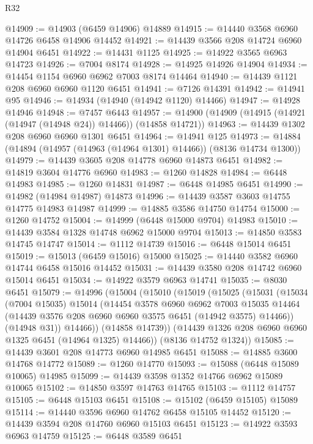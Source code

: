 \begin{lexlean}{R32}
\begin{coremodule}
@14909 := @14903 (@6459 @14906) @14889
@14915 := @14440 @3568 @6960 @14726 @6458 @14906 @14452
@14921 := @14439 @3566 @208 @14724 @6960 @14904 @6451
@14922 := @14431 @1125
@14925 := @14922 @3565 @6963 @14723
@14926 := @7004 @8174
@14928 := @14925 @14926 @14904
@14934 := @14454 @1154 @6960 @6962 @7003 @8174 @14464
@14940 := @14439 @1121 @208 @6960 @6960 @1120 @6451
@14941 := @7126 @14391
@14942 := @14941 @95
@14946 := @14934 (@14940 (@14942 @1120) @14466)
@14947 := @14928 @14946
@14948 := @7457 @6443
@14957 := @14900 (@14909 (@14915 (@14921 (@14947 (@14948 @24)) @14466)) (@14858 @14721))
@14963 := @14439 @1302 @208 @6960 @6960 @1301 @6451
@14964 := @14941 @125
@14973 := @14884 (@14894 (@14957 (@14963 (@14964 @1301) @14466)) (@8136 @14734 @1300))
@14979 := @14439 @3605 @208 @14778 @6960 @14873 @6451
@14982 := @14819 @3604 @14776 @6960
@14983 := @1260 @14828
@14984 := @6448 @14983
@14985 := @1260 @14831
@14987 := @6448 @14985 @6451
@14990 := @14982 (@14984 @14987) @14873
@14996 := @14439 @3587 @3603 @14755 @14775 @14983 @14987
@14999 := @14885 @3586 @14750 @14754
@15000 := @1260 @14752
@15004 := @14999 (@6448 @15000 @9704) @14983
@15010 := @14439 @3584 @1328 @14748 @6962 @15000 @9704
@15013 := @14850 @3583 @14745 @14747
@15014 := @1112 @14739
@15016 := @6448 @15014 @6451
@15019 := @15013 (@6459 @15016) @15000
@15025 := @14440 @3582 @6960 @14744 @6458 @15016 @14452
@15031 := @14439 @3580 @208 @14742 @6960 @15014 @6451
@15034 := @14922 @3579 @6963 @14741
@15035 := @8030 @6451
@15079 := @14996
    (@15004
      (@15010
        (@15019
          (@15025
            (@15031
              (@15034
                (@7004 @15035)
                @15014
                (@14454
                  @3578
                  @6960
                  @6962
                  @7003
                  @15035
                  @14464
                  (@14439 @3576 @208 @6960 @6960 @3575 @6451 (@14942 @3575) @14466))
                (@14948 @31))
              @14466))
          (@14858 @14739))
        (@14439 @1326 @208 @6960 @6960 @1325 @6451 (@14964 @1325) @14466))
      (@8136 @14752 @1324))
@15085 := @14439 @3601 @208 @14773 @6960 @14985 @6451
@15088 := @14885 @3600 @14768 @14772
@15089 := @1260 @14770
@15093 := @15088 (@6448 @15089 @10065) @14985
@15099 := @14439 @3598 @1352 @14766 @6962 @15089 @10065
@15102 := @14850 @3597 @14763 @14765
@15103 := @1112 @14757
@15105 := @6448 @15103 @6451
@15108 := @15102 (@6459 @15105) @15089
@15114 := @14440 @3596 @6960 @14762 @6458 @15105 @14452
@15120 := @14439 @3594 @208 @14760 @6960 @15103 @6451
@15123 := @14922 @3593 @6963 @14759
@15125 := @6448 @3589 @6451

\end{coremodule}
\end{lexlean}

